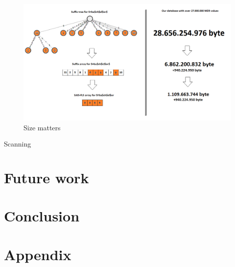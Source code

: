 \documentclass[12pt]{article} %
\begin{document}
\begin{figure}[H]
    \centering
    \includegraphics[width=1.0\textwidth]{sizematters}
    \captionsetup{width=0.8\textwidth}
    \caption{Size matters}
    \label{fig:sizematters}
\end{figure}

Scanning


\section{Future work}

\section{Conclusion}

\section{Appendix}




\newpage
\appendix
\label{appendix}
\end{document}
